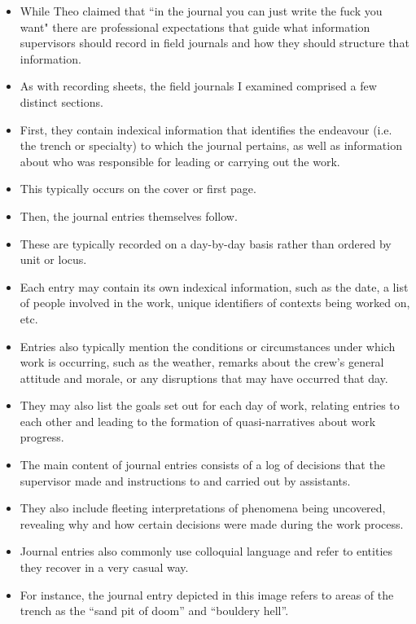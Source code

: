 \documentclass{article}
\begin{document}
\begin{itemize}
  \item While Theo claimed that “in the journal you can just write the fuck you want" there are professional expectations that guide what information supervisors should record in field journals and how they should structure that information.
  \item As with recording sheets, the field journals I examined comprised a few distinct sections.
  \item First, they contain indexical information that identifies the endeavour (i.e. the trench or specialty) to which the journal pertains, as well as information about who was responsible for leading or carrying out the work.
  \item This typically occurs on the cover or first page.
  \item Then, the journal entries themselves follow.
  \item These are typically recorded on a day-by-day basis rather than ordered by unit or locus.
  \item Each entry may contain its own indexical information, such as the date, a list of people involved in the work, unique identifiers of contexts being worked on, etc.
  \item Entries also typically mention the conditions or circumstances under which work is occurring, such as the weather, remarks about the crew’s general attitude and morale, or any disruptions that may have occurred that day.
  \item They may also list the goals set out for each day of work, relating entries to each other and leading to the formation of quasi-narratives about work progress.
  \item The main content of journal entries consists of a log of decisions that the supervisor made and instructions to and carried out by assistants.
  \item They also include fleeting interpretations of phenomena being uncovered, revealing why and how certain decisions were made during the work process.
  \item Journal entries also commonly use colloquial language and refer to entities they recover in a very casual way.
  \item For instance, the journal entry depicted in this image refers to areas of the trench as the “sand pit of doom” and “bouldery hell”.
  

\end{itemize}
\end{document}
